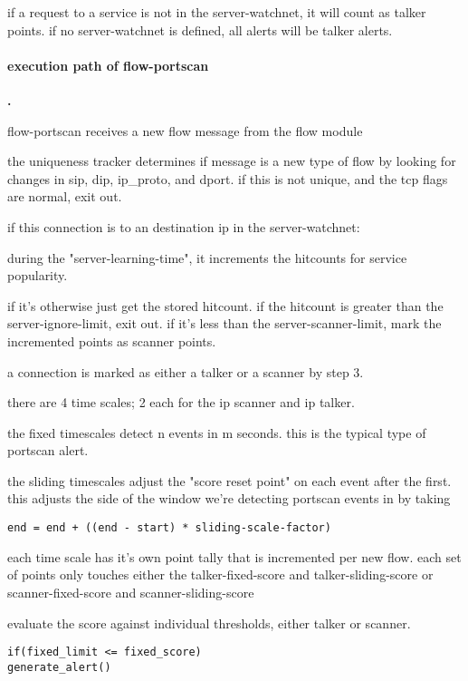 \documentclass[english]{report}
\newcounter{slistnum}
\newenvironment{slist}{
    \begin{list}{
        {
            \bf \arabic{slistnum}.
        } 
    }{
        \usecounter{slistnum} 
    }
}{
    \end{list} 
}
\begin{document}
if a request to a service is not in the server-watchnet, it will count as
talker points. if no server-watchnet is defined, all alerts will be talker
alerts.


\paragraph{execution path of flow-portscan}


\begin{slist}
\item flow-portscan receives a new flow message from the flow module
\item the uniqueness tracker determines if message is a new type of flow by
looking for changes in sip, dip, ip\_proto, and dport.  if this is not unique,
and the tcp flags are normal, exit out.
\item if this connection is to an destination ip in the server-watchnet:

during the "server-learning-time", it increments the hitcounts for service
popularity. 

      if it's otherwise just get the stored hitcount.  if the hitcount is
      greater than the server-ignore-limit, exit out.  if it's less than the
      server-scanner-limit, mark the incremented points as scanner points.

\item a connection is marked as either a talker or a scanner by step 3.

there are 4 time scales; 2 each for the ip scanner and ip talker.

the fixed timescales detect n events in m seconds.  this is the typical type of
portscan alert.

the sliding timescales adjust the "score reset point" on each event after the
first.  this adjusts the side of the window we're detecting portscan events in
by taking

\begin{verbatim} 
end = end + ((end - start) * sliding-scale-factor)
\end{verbatim}

each time scale has it's own point tally that is incremented per new flow.
each set of points only touches either the talker-fixed-score and talker-sliding-score or scanner-fixed-score and scanner-sliding-score

\item evaluate the score against individual thresholds, either talker or
scanner. 

\begin{verbatim}
if(fixed_limit <= fixed_score)
generate_alert()
\end{verbatim}
\end{slist}
\end{document}
